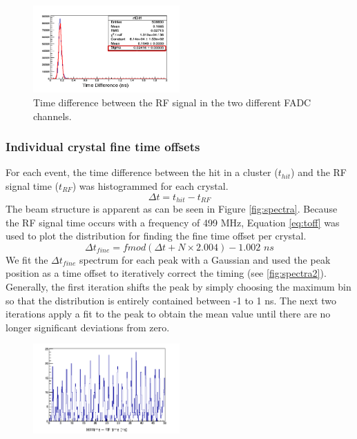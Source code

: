 \documentclass[twoside]{article}
\begin{document}
\begin{multicols}{2}
\begin{figure}[H]
  \centering
      \includegraphics[width=0.5\textwidth]{rfRes.png}
  \caption{Time difference between the RF signal in the two different FADC channels.}
  \label{rfresolution}
\end{figure}

\subsubsection{Individual crystal fine time offsets}
	For each event, the time difference between the hit in a cluster ($t_{hit}$) and the RF signal time ($t_{RF}$) was histogrammed for each crystal. 
\begin{equation}
\label{eq:timediff}
\Delta t = t_{hit}-t_{RF} 
\end{equation}	
The beam structure is apparent as can be seen in Figure \ref{fig:spectra}. Because the RF signal time occurs with a frequency of 499 MHz, Equation \ref{eq:toff} was used to plot the distribution for finding the fine time offset per crystal.  \\
\begin{equation}
\label{eq:toff}
\Delta t_{fine} = fmod(\Delta t+N\times 2.004)-1.002 \textit{ ns}
\end{equation}
We fit the $\Delta t_{fine}$ spectrum for each peak with a Gaussian and used the peak position as a time offset to iteratively correct the timing (see \ref{fig:spectra2}). Generally, the first iteration shifts the peak by simply choosing the maximum bin so that the distribution is entirely contained between -1 to 1 ns. The next two iterations apply a fit to the peak to obtain the mean value until there are no longer significant deviations from zero.    
\begin{figure}[H]
  \centering
      \includegraphics[width=0.5\textwidth]{crystalSpectra.png}

\end{figure}
\end{multicols}
\end{document}
